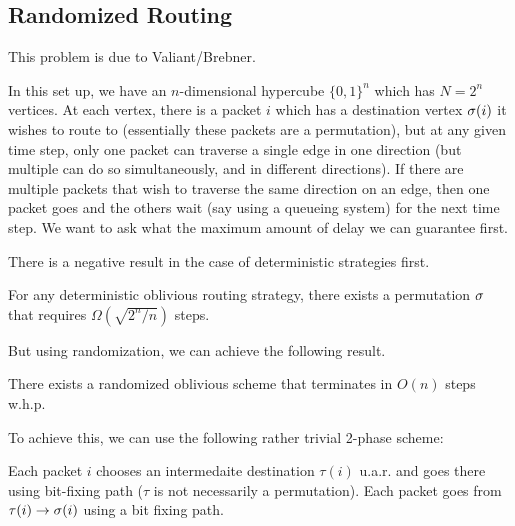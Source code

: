\documentclass[11 pt]{scrartcl}
\begin{document}
\subsection{Randomized Routing}
This problem is due to Valiant/Brebner. 

In this set up, we have an $n$-dimensional hypercube $\{0,1\}^n$ which has $N = 2^n$ vertices. At each vertex, there is a packet $i$ which has a destination vertex $\sigma(i)$ it wishes to route to (essentially these packets are a permutation), but at any given time step, only one packet can traverse a single edge in one direction (but multiple can do so simultaneously, and in different directions). If there are multiple packets that wish to traverse the same direction on an edge, then one packet goes and the others wait (say using a queueing system) for the next time step. We want to ask what the maximum amount of delay we can guarantee first. 

There is a negative result in the case of deterministic strategies first. 
\begin{theorem}
    For any deterministic oblivious routing strategy, there exists a permutation $\sigma$ that requires $\Omega(\sqrt{2^n/n})$ steps.
\end{theorem}

But using randomization, we can achieve the following result.
\begin{theorem}
    There exists a randomized oblivious scheme that terminates in $O(n)$ steps w.h.p.
\end{theorem}
To achieve this, we can use the following rather trivial 2-phase scheme: 
\begin{enumerate}
    \ii Each packet $i$ chooses an intermedaite destination $\tau(i)$ u.a.r. and goes there using bit-fixing path ($\tau$ is not necessarily a permutation).
    \ii Each packet goes from $\tau(i)\to \sigma(i)$ using a bit fixing path.
\end{enumerate}
\end{document}
